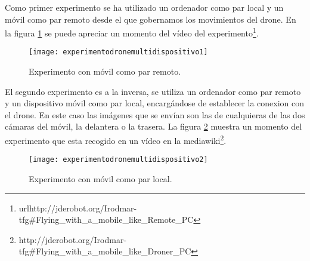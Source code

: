 Como primer experimento se ha utilizado un ordenador como par local y un móvil como par remoto desde el que gobernamos los movimientos del drone. En la figura \ref{fig:experimentodronemultidispositivo1} se puede apreciar un momento del vídeo del experimento\footnote{url{http://jderobot.org/Irodmar-tfg\#Flying_with_a_mobile_like_Remote_PC}}.\\

\begin{figure}[h!]
\centering
\texttt{[image: experimentodronemultidispositivo1]}
\caption{Experimento con móvil como par remoto.}
\label{fig:experimentodronemultidispositivo1}
\end{figure}

El segundo experimento es a la inversa, se utiliza un ordenador como par remoto y un dispositivo móvil como par local, encargándose de establecer la conexion con el drone. En este caso las imágenes que se envían son las de cualquieras de las dos cámaras del móvil, la delantera o la trasera. La figura \ref{fig:experimentodronemultidispositivo2} muestra un momento del experimento que esta recogido en un vídeo en la mediawiki\footnote{http://jderobot.org/Irodmar-tfg\#Flying_with_a_mobile_like_Droner_PC}.\\

\begin{figure}[h!]
\centering
\texttt{[image: experimentodronemultidispositivo2]}
\caption{Experimento con móvil como par local.}
\label{fig:experimentodronemultidispositivo2}
\end{figure}